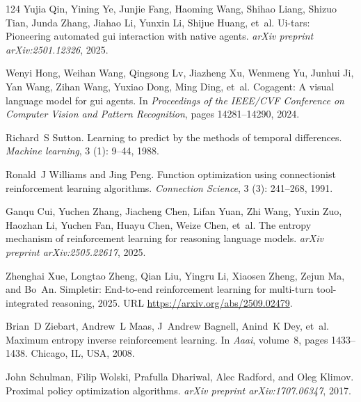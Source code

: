 \documentclass[]{youtu} %
\begin{document}
\begin{thebibliography}{124}
Yujia Qin, Yining Ye, Junjie Fang, Haoming Wang, Shihao Liang, Shizuo Tian, Junda Zhang, Jiahao Li, Yunxin Li, Shijue Huang, et~al.
\newblock Ui-tars: Pioneering automated gui interaction with native agents.
\newblock \emph{arXiv preprint arXiv:2501.12326}, 2025{}.

Wenyi Hong, Weihan Wang, Qingsong Lv, Jiazheng Xu, Wenmeng Yu, Junhui Ji, Yan Wang, Zihan Wang, Yuxiao Dong, Ming Ding, et~al.
\newblock Cogagent: A visual language model for gui agents.
\newblock In \emph{Proceedings of the IEEE/CVF Conference on Computer Vision and Pattern Recognition}, pages 14281--14290, 2024.

Richard~S Sutton.
\newblock Learning to predict by the methods of temporal differences.
\newblock \emph{Machine learning}, 3 (1): 9--44, 1988.

Ronald~J Williams and Jing Peng.
\newblock Function optimization using connectionist reinforcement learning algorithms.
\newblock \emph{Connection Science}, 3 (3): 241--268, 1991.

Ganqu Cui, Yuchen Zhang, Jiacheng Chen, Lifan Yuan, Zhi Wang, Yuxin Zuo, Haozhan Li, Yuchen Fan, Huayu Chen, Weize Chen, et~al.
\newblock The entropy mechanism of reinforcement learning for reasoning language models.
\newblock \emph{arXiv preprint arXiv:2505.22617}, 2025{}.

Zhenghai Xue, Longtao Zheng, Qian Liu, Yingru Li, Xiaosen Zheng, Zejun Ma, and Bo~An.
\newblock Simpletir: End-to-end reinforcement learning for multi-turn tool-integrated reasoning, 2025.
\newblock URL \url{https://arxiv.org/abs/2509.02479}.

Brian~D Ziebart, Andrew~L Maas, J~Andrew Bagnell, Anind~K Dey, et~al.
\newblock Maximum entropy inverse reinforcement learning.
\newblock In \emph{Aaai}, volume~8, pages 1433--1438. Chicago, IL, USA, 2008.

John Schulman, Filip Wolski, Prafulla Dhariwal, Alec Radford, and Oleg Klimov.
\newblock Proximal policy optimization algorithms.
\newblock \emph{arXiv preprint arXiv:1707.06347}, 2017{}.


\end{thebibliography}
\end{document}
